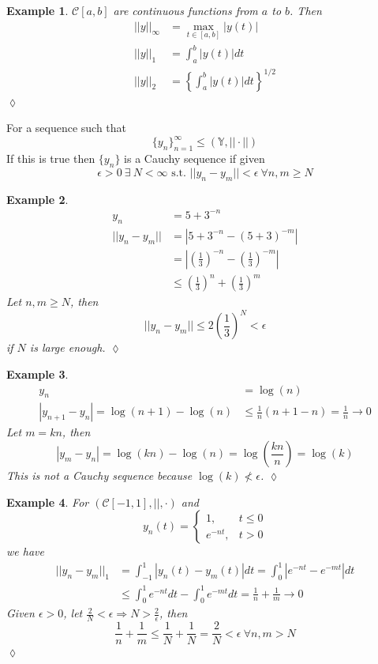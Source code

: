 \documentclass[lecture,12pt,]{pcms-l}
\theoremstyle{example}
\newtheorem{example}{Example}[section]
\newcommand{\vsp}{(\mathbb{Y},||\cdot||)}
\begin{document}
\begin{example}
$\mathcal{C}[a,b]$ are continuous functions from $a$ to $b$. Then
\begin{align*}
||y||_\infty &= \max_{t\in[a,b]}|y(t)| \\
||y||_1 &= \int_a^b|y(t)|dt \\
||y||_2 &= \left\lbrace\int_a^b|y(t)|dt\right\rbrace^{1/2}
\end{align*}
$\lozenge$
\end{example}

\begin{definition}
For a sequence such that
$$\{y_n\}_{n=1}^\infty \leq \vsp$$
If this is true then $\{y_n\}$ is a Cauchy sequence if given
$$\epsilon>0 ~\exists ~N<\infty \text{ s.t. } ||y_n-y_m||<\epsilon ~\forall n,m\geq N$$
\end{definition}

\begin{example}
\begin{align*}
y_n &= 5+3^{-n} \\
||y_n-y_m|| &= |5+3^{-n}-(5+3)^{-m}| \\
&= \left|\left(\frac{1}{3}\right)^{-n} - \left(\frac{1}{3}\right)^{-m}\right| \\
&\leq \left(\frac{1}{3}\right)^n + \left(\frac{1}{3}\right)^m
\end{align*}
Let $n,m\geq N$, then
$$||y_n-y_m|| \leq 2\left(\frac{1}{3}\right)^N < \epsilon$$
if $N$ is large enough.
$\lozenge$
\end{example}

\begin{example}
\begin{align*}
y_n &= \log(n) \\
|y_{n+1}-y_n| = \log(n+1)-\log(n) &\leq \frac{1}{n}(n+1-n) = \frac{1}{n}\to 0
\end{align*}
Let $m=kn$, then
$$|y_m-y_n| = \log(kn)-\log(n) = \log\left(\frac{kn}{n}\right) = \log(k)$$
This is not a Cauchy sequence because $\log(k)\nless\epsilon$.
$\lozenge$
\end{example}

\begin{example}
\label{ex:1norm}
For $(\mathcal{C}[-1,1],||,\cdot)$ and
$$y_n(t) = \begin{cases} 1, & t\leq 0 \\ e^{-nt}, & t>0 \end{cases}$$
we have
\begin{align*}
||y_n-y_m||_1 &= \int_{-1}^1|y_n(t)-y_m(t)|dt = \int_0^1|e^{-nt}-e^{-mt}|dt \\
&\leq \int_0^1e^{-nt}dt - \int_0^1e^{-mt}dt = \frac{1}{n} + \frac{1}{m} \to 0
\end{align*}
Given $\epsilon>0$, let $\frac{2}{N}<\epsilon\Rightarrow N>\frac{2}{\epsilon}$, then
$$\frac{1}{n} + \frac{1}{m}\leq \frac{1}{N}+\frac{1}{N} = \frac{2}{N}<\epsilon ~\forall n,m>N$$
$\lozenge$
\end{example}
\end{document}
